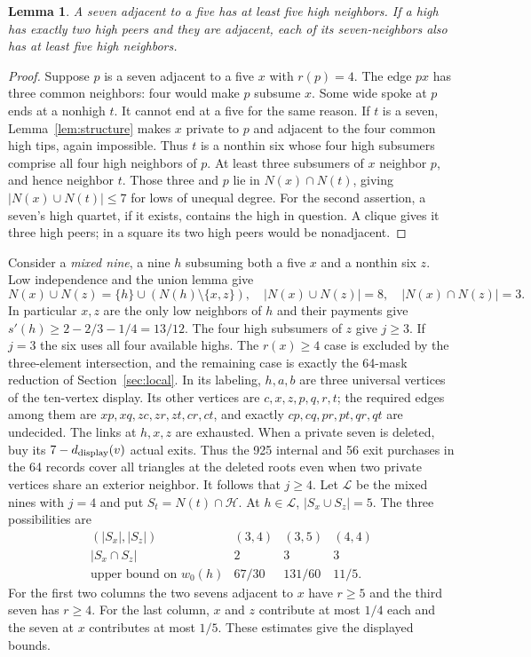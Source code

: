 \documentclass[11pt,a4paper]{amsart}
\newtheorem{lemma}[theorem]{Lemma}
\newcommand{\Hi}{\mathcal H}
\newcommand{\LL}{\mathcal L}
\begin{document}
\begin{lemma}\label{lem:seven-five}
A seven adjacent to a five has at least five high neighbors.
If a high has exactly two high peers and they are adjacent, each of
its seven-neighbors also has at least five high neighbors.
\end{lemma}
\begin{proof}
Suppose $p$ is a seven adjacent to a five $x$ with $r(p)=4$.
The edge $px$ has three common neighbors: four would make $p$
subsume $x$. Some wide spoke at $p$ ends at a nonhigh $t$.
It cannot end at a five for the same reason. If $t$ is a seven,
Lemma~\ref{lem:structure} makes $x$ private to $p$ and adjacent
to the four common high tips, again impossible. Thus $t$ is a
nonthin six whose four high subsumers comprise all four high
neighbors of $p$. At least three subsumers of $x$ neighbor $p$,
and hence neighbor $t$. Those three and $p$ lie in
$N(x)\cap N(t)$, giving $|N(x)\cup N(t)|\le7$ for lows of
unequal degree. For the second assertion, a seven's high quartet,
if it exists, contains the high in question. A clique gives it
three high peers; in a square its two high peers would be
nonadjacent.
\end{proof}

Consider a \emph{mixed nine}, a nine $h$ subsuming both a five $x$
and a nonthin six $z$. Low independence and the union lemma give
\begin{equation}\label{eq:union}
 N(x)\cup N(z)=\{h\}\cup(N(h)\setminus\{x,z\}),\quad
 |N(x)\cup N(z)|=8,\quad |N(x)\cap N(z)|=3 .
\end{equation}
In particular $x,z$ are the only low neighbors of $h$ and their
payments give $s'(h)\ge 2-2/3-1/4=13/12$. The four high subsumers
of $z$ give $j\ge3$. If $j=3$ the six uses all four available
highs. The $r(x)\ge4$ case is excluded by the three-element
intersection, and the remaining case is exactly the 64-mask
reduction of Section~\ref{sec:local}. In its labeling, $h,a,b$
are three universal vertices of the ten-vertex display. Its other
vertices are $c,x,z,p,q,r,t$; the required edges among them are
$xp,xq,zc,zr,zt,cr,ct$, and exactly $cp,cq,pr,pt,qr,qt$ are
undecided. The links at $h,x,z$ are exhausted. When a private
seven is deleted, buy its $7-d_{\rm display}(v)$ actual exits.
Thus the 925 internal and 56 exit purchases in the 64 records
cover all triangles at the deleted roots even when two private
vertices share an exterior neighbor. It follows that $j\ge4$.
Let $\LL$ be the mixed nines with $j=4$ and put $S_t=N(t)\cap\Hi$.
At $h\in\LL$, $|S_x\cup S_z|=5$. The three possibilities are
\[
\begin{array}{c|ccc}
 (|S_x|,|S_z|)&(3,4)&(3,5)&(4,4)\\ \hline
 |S_x\cap S_z|&2&3&3\\
 \text{upper bound on }w_0(h)&67/30&131/60&11/5 .
\end{array}
\]
For the first two columns the two sevens adjacent to $x$ have
$r\ge5$ and the third seven has $r\ge4$. For the last column,
$x$ and $z$ contribute at most $1/4$ each and the seven at $x$
contributes at most $1/5$. These estimates give the displayed bounds.
\end{document}
